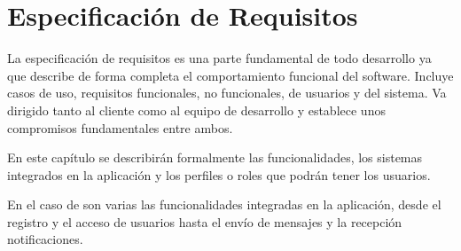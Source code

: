 %
%
%
%

\cleardoublepage
\chapter{Especificación de Requisitos}
\label{chap:requirements}

	La especificación de requisitos es una parte fundamental de todo desarrollo ya que describe de forma completa el comportamiento funcional del software. Incluye casos de uso, requisitos funcionales, no funcionales, de usuarios y del sistema.
	Va dirigido tanto al cliente como al equipo de desarrollo y establece unos compromisos fundamentales entre ambos.
	
	\bigskip
	En este capítulo se describirán formalmente las funcionalidades, los sistemas integrados en la aplicación y los perfiles o roles que podrán tener los usuarios.
	
	\bigskip
	En el caso de \CollegeApp son varias las funcionalidades integradas en la aplicación, desde el registro y el acceso de usuarios hasta el envío de mensajes y la recepción notificaciones.
	

